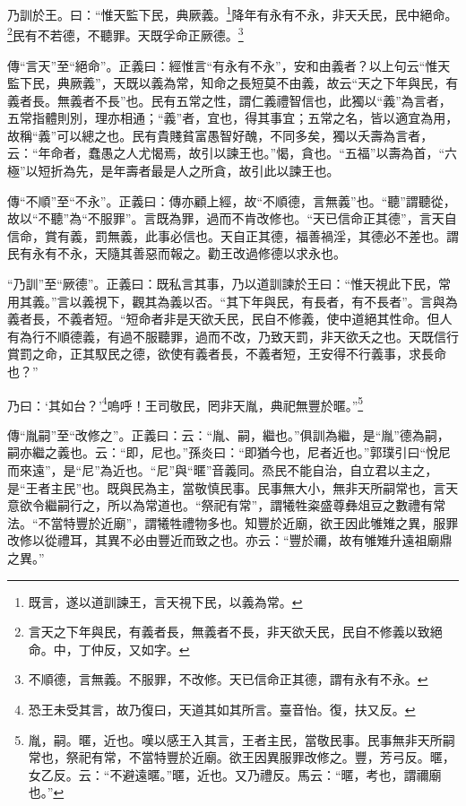 乃訓於王。曰：“惟天監下民，典厥義。\footnote{既言，遂以道訓諫王，言天視下民，以義為常。}降年有永有不永，非天夭民，民中絕命。\footnote{言天之下年與民，有義者長，無義者不長，非天欲夭民，民自不修義以致絕命。中，丁仲反，又如字。}民有不若德，不聽罪。天既孚命正厥德。\footnote{不順德，言無義。不服罪，不改修。天已信命正其德，謂有永有不永。}


{\noindent\zhuan{}\fzbyks 傳“言天”至“絕命”。正義曰：經惟言“有永有不永”，安和由義者？以上句云“惟天監下民，典厥義”，天既以義為常，知命之長短莫不由義，故云“天之下年與民，有義者長。無義者不長”也。民有五常之性，謂仁義禮智信也，此獨以“義”為言者，五常指體則別，理亦相通；“義”者，宜也，得其事宜；五常之名，皆以適宜為用，故稱“義”可以總之也。民有貴賤貧富愚智好醜，不同多矣，獨以夭壽為言者，云：“年命者，蠢愚之人尤愒焉，故引以諫王也。”愒，貪也。“五福”以壽為首，“六極”以短折為先，是年壽者最是人之所貪，故引此以諫王也。 \par}

{\noindent\zhuan{}\fzbyks 傳“不順”至“不永”。正義曰：傳亦顧上經，故“不順德，言無義”也。“聽”謂聽從，故以“不聽”為“不服罪”。言既為罪，過而不肯改修也。“天已信命正其德”，言天自信命，賞有義，罰無義，此事必信也。天自正其德，福善禍淫，其德必不差也。謂民有永有不永，天隨其善惡而報之。勸王改過修德以求永也。 \par}

{\noindent\shu{}\fzkt “乃訓”至“厥德”。正義曰：既私言其事，乃以道訓諫於王曰：“惟天視此下民，常用其義。”言以義視下，觀其為義以否。“其下年與民，有長者，有不長者”。言與為義者長，不義者短。“短命者非是天欲夭民，民自不修義，使中道絕其性命。但人有為行不順德義，有過不服聽罪，過而不改，乃致天罰，非天欲夭之也。天既信行賞罰之命，正其馭民之德，欲使有義者長，不義者短，王安得不行義事，求長命也？” \par}

乃曰：‘其如台？’\footnote{恐王未受其言，故乃復曰，天道其如其所言。臺音怡。復，扶又反。}嗚呼！王司敬民，罔非天胤，典祀無豐於暱。”\footnote{胤，嗣。暱，近也。嘆以感王入其言，王者主民，當敬民事。民事無非天所嗣常也，祭祀有常，不當特豐於近廟。欲王因異服罪改修之。豐，芳弓反。暱，女乙反。云：“不避遠暱。”暱，近也。又乃禮反。馬云：“暱，考也，謂禰廟也。”}


{\noindent\zhuan{}\fzbyks 傳“胤嗣”至“改修之”。正義曰：云：“胤、嗣，繼也。”俱訓為繼，是“胤”德為嗣，嗣亦繼之義也。云：“即，尼也。”孫炎曰：“即猶今也，尼者近也。”郭璞引曰“悅尼而來遠”，是“尼”為近也。“尼”與“暱”音義同。烝民不能自治，自立君以主之，是“王者主民”也。既與民為主，當敬慎民事。民事無大小，無非天所嗣常也，言天意欲令繼嗣行之，所以為常道也。“祭祀有常”，謂犧牲粢盛尊彝俎豆之數禮有常法。“不當特豐於近廟”，謂犧牲禮物多也。知豐於近廟，欲王因此雊雉之異，服罪改修以從禮耳，其異不必由豐近而致之也。亦云：“豐於禰，故有雊雉升遠祖廟鼎之異。” \par}

